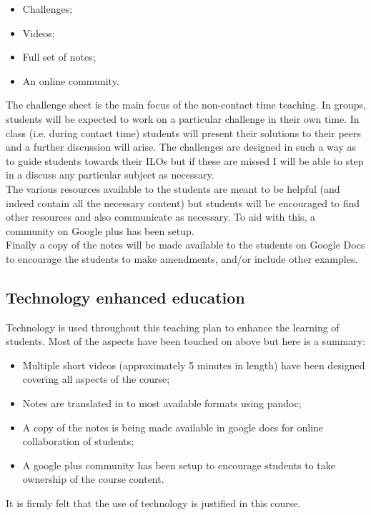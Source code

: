 \documentclass[a4paper,12pt]{article}
\begin{document}
\begin{itemize}
    \item Challenges;
    \item Videos;
    \item Full set of notes;
    \item An online community.
\end{itemize}

The challenge sheet is the main focus of the non-contact time teaching. In groups, students will be expected to work on a particular challenge in their own time. In class (i.e. during contact time) students will present their solutions to their peers and a further discussion will arise. The challenges are designed in such a way as to guide students towards their ILOs but if these are missed I will be able to step in a discuss any particular subject as necessary.\\

The various resources available to the students are meant to be helpful (and indeed contain all the necessary content) but students will be encouraged to find other resources and also communicate as necessary. To aid with this, a community on Google plus has been setup.\\

Finally a copy of the notes will be made available to the students on Google Docs to encourage the students to make amendments, and/or include other examples.\\

\subsection{Technology enhanced education}

Technology is used throughout this teaching plan to enhance the learning of students. Most of the aspects have been touched on above but here is a summary:

\begin{itemize}
    \item Multiple short videos (approximately 5 minutes in length) have been designed covering all aspects of the course;
    \item Notes are translated in to most available formats using pandoc;
    \item A copy of the notes is being made available in google docs for online collaboration of students;
    \item A google plus community has been setup to encourage students to take ownership of the course content.
\end{itemize}

It is firmly felt that the use of technology is justified in this course.
\end{document}
